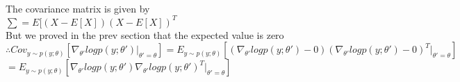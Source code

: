 \begin{answer}\\
The covariance matrix is given by\\
$\sum=E[(X-E[X])(X-E[X])^T$\\
But we proved in the prev section that the expected value is zero\\
$\therefore Cov_{y \sim p(y;\theta)} \left[ \nabla_{\theta'}log p(y;\theta')|_{\theta'=\theta} \right] =E_{y \sim p(y;\theta)}[(\nabla_{\theta'}log p(y;\theta')-0)(\nabla_{\theta'}log p(y;\theta')-0)^T|_{\theta'=\theta}]$\\
$=E_{y \sim p(y;\theta)}[\nabla_{\theta'}log p(y;\theta') \nabla_{\theta'}log p(y;\theta')^T|_{\theta'=\theta}]$\\
\end{answer}
